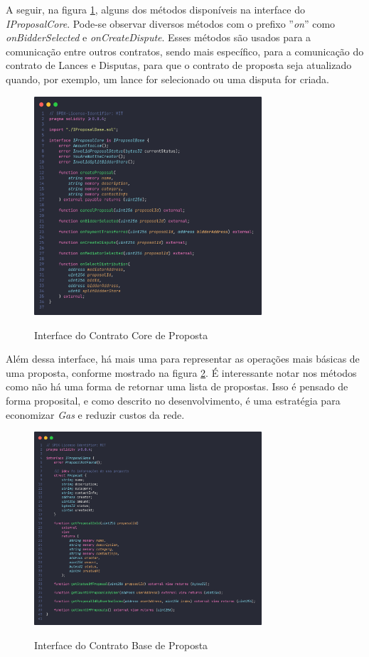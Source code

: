 A seguir, na figura \ref{fig:proposal_core_contract_fig}, alguns dos métodos disponíveis na interface do \textit{IProposalCore}. Pode-se observar diversos métodos com o prefixo ''\textit{on}'' como \textit{onBidderSelected} e \textit{onCreateDispute}. Esses métodos são usados para a comunicação entre outros contratos, sendo mais específico, para a comunicação do contrato de Lances e Disputas, para que o contrato de proposta seja atualizado quando, por exemplo, um lance for selecionado ou uma disputa for criada.

\begin{figure}[!h]
  \centering
  \caption{Interface do Contrato Core de Proposta}
  \includegraphics[width=320px]{src/images/contracts/proposal_core_contract.png}
  \label{fig:proposal_core_contract_fig}
\end{figure}

Além dessa interface, há mais uma para representar as operações mais básicas de uma proposta, conforme mostrado na figura \ref{fig:proposal_base_contract_fig}. É interessante notar nos métodos como não há uma forma de retornar uma lista de propostas. Isso é pensado de forma proposital, e como descrito no desenvolvimento, é uma estratégia para economizar \textit{Gas} e reduzir custos da rede.

\begin{figure}[!h]
  \centering
  \caption{Interface do Contrato Base de Proposta}
  \includegraphics[width=320px]{src/images/contracts/proposal_base_contract.png}
  \label{fig:proposal_base_contract_fig}
\end{figure}

